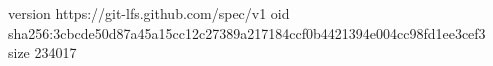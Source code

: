 version https://git-lfs.github.com/spec/v1
oid sha256:3cbcde50d87a45a15cc12c27389a217184ccf0b4421394e004cc98fd1ee3cef3
size 234017
